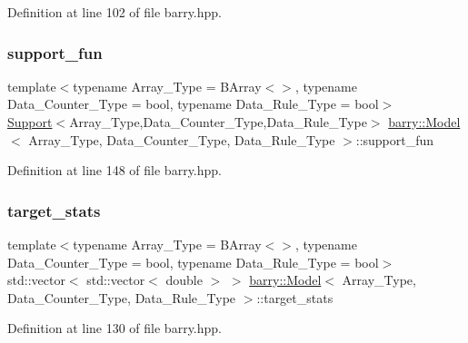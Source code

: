 Definition at line 102 of file barry.\+hpp.

\mbox{\label{classbarry_1_1_model_afd005aae0fdd12a8c68d1fd8823b3727}} 
\subsubsection{\texorpdfstring{support\+\_\+fun}{support\_fun}}
{\footnotesize\ttfamily template$<$typename Array\+\_\+\+Type  = B\+Array$<$$>$, typename Data\+\_\+\+Counter\+\_\+\+Type  = bool, typename Data\+\_\+\+Rule\+\_\+\+Type  = bool$>$ \\
\hyperlink{classbarry_1_1_support}{Support}$<$Array\+\_\+\+Type,Data\+\_\+\+Counter\+\_\+\+Type,Data\+\_\+\+Rule\+\_\+\+Type$>$ \hyperlink{classbarry_1_1_model}{barry\+::\+Model}$<$ Array\+\_\+\+Type, Data\+\_\+\+Counter\+\_\+\+Type, Data\+\_\+\+Rule\+\_\+\+Type $>$\+::support\+\_\+fun}



Definition at line 148 of file barry.\+hpp.

\mbox{\label{classbarry_1_1_model_ab2a0fde37b6a6da5a5faffcd24ec4c27}} 
\subsubsection{\texorpdfstring{target\+\_\+stats}{target\_stats}}
{\footnotesize\ttfamily template$<$typename Array\+\_\+\+Type  = B\+Array$<$$>$, typename Data\+\_\+\+Counter\+\_\+\+Type  = bool, typename Data\+\_\+\+Rule\+\_\+\+Type  = bool$>$ \\
std\+::vector$<$ std\+::vector$<$ double $>$ $>$ \hyperlink{classbarry_1_1_model}{barry\+::\+Model}$<$ Array\+\_\+\+Type, Data\+\_\+\+Counter\+\_\+\+Type, Data\+\_\+\+Rule\+\_\+\+Type $>$\+::target\+\_\+stats}



Definition at line 130 of file barry.\+hpp.

\mbox{\label{classbarry_1_1_model_a08c74ccd0aa76906f724ccb5e36d0762}} 
